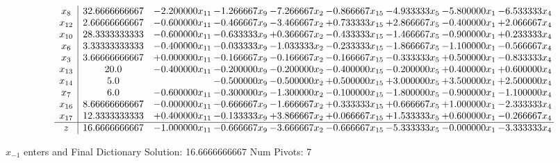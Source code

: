 \documentclass[10pt]{article}
\begin{document}
 \[\begin{array}{c| c c@{\hskip 2pt} c@{\hskip 2pt} c@{\hskip 2pt} c@{\hskip 2pt} c@{\hskip 2pt} c@{\hskip 2pt} c@{\hskip 2pt} }
 x_{8}   &  32.6666666667 & -2.200000 x_{11} & -1.266667 x_{9} & -7.266667 x_{2} & -0.866667 x_{15} & -4.933333 x_{5} & -5.800000 x_{1} & -6.533333 x_{4}\\
 x_{12}   &  2.66666666667 & -0.600000 x_{11} & -0.466667 x_{9} & -3.466667 x_{2} & + 0.733333 x_{15} & + 2.866667 x_{5} & -0.400000 x_{1} & + 2.066667 x_{4}\\
 x_{10}   &  28.3333333333 & -0.600000 x_{11} & -0.633333 x_{9} & + 0.366667 x_{2} & -0.433333 x_{15} & -1.466667 x_{5} & -0.900000 x_{1} & + 0.233333 x_{4}\\
 x_{6}   &  3.33333333333 & -0.400000 x_{11} & -0.033333 x_{9} & -1.033333 x_{2} & -0.233333 x_{15} & -1.866667 x_{5} & -1.100000 x_{1} & -0.566667 x_{4}\\
 x_{3}   &  3.66666666667 & + 0.000000 x_{11} & -0.166667 x_{9} & -0.166667 x_{2} & -0.166667 x_{15} & -0.333333 x_{5} & + 0.500000 x_{1} & -0.833333 x_{4}\\
 x_{13}   &  20.0 & -0.400000 x_{11} & -0.200000 x_{9} & -0.200000 x_{2} & -0.400000 x_{15} & -0.200000 x_{5} & + 0.400000 x_{1} & + 0.600000 x_{4}\\
 x_{14}   &  5.0  &   & -0.500000 x_{9} & -0.500000 x_{2} & + 0.500000 x_{15} & + 3.000000 x_{5} & + 3.500000 x_{1} & + 2.500000 x_{4}\\
 x_{7}   &  6.0 & -0.600000 x_{11} & -0.300000 x_{9} & -1.300000 x_{2} & -0.100000 x_{15} & -1.800000 x_{5} & -0.900000 x_{1} & -1.100000 x_{4}\\
 x_{16}   &  8.66666666667 & -0.000000 x_{11} & -0.666667 x_{9} & -1.666667 x_{2} & + 0.333333 x_{15} & + 0.666667 x_{5} & + 1.000000 x_{1} & -2.333333 x_{4}\\
 x_{17}   &  12.3333333333 & + 0.400000 x_{11} & -0.133333 x_{9} & + 3.866667 x_{2} & + 0.066667 x_{15} & + 1.533333 x_{5} & + 0.600000 x_{1} & -0.266667 x_{4}\\
\hline
z    &  16.6666666667 & -1.000000 x_{11} & -0.666667 x_{9} & -3.666667 x_{2} & -0.666667 x_{15} & -5.333333 x_{5} & -0.000000 x_{1} & -3.333333 x_{4}\\
\end{array}\]


 $ x_{-1} $ enters and Final Dictionary
Solution:  16.6666666667
Num Pivots:  7
\end{document}
